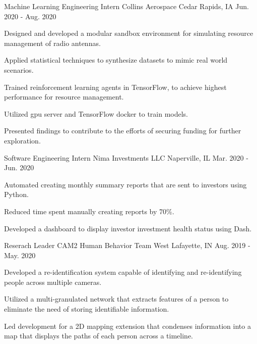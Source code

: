 
\begin{cventries}
  \cventry
    {Machine Learning Engineering Intern}
    {Collins Aerospace}
    {Cedar Rapids, IA}
    {Jun. 2020 - Aug. 2020}
    {
      \begin{cvitems}
          \item {Designed and developed a modular sandbox environment for simulating resource management of radio antennas.}
          \item {Applied statistical techniques to synthesize datasets to mimic real world scenarios.}
          \item{Trained reinforcement learning agents in TensorFlow, to achieve highest performance for resource management.}
          \item{Utilized gpu server and TensorFlow docker to train models.}
          \item{Presented findings to contribute to the efforts of securing funding for further exploration.}
      \end{cvitems}
    }
  \cventry
    {Software Engineering Intern} %
    {Nima Investments LLC} %
    {Naperville, IL} %
    {Mar. 2020 - Jun. 2020} %
    {
      \begin{cvitems} %
        \item{Automated creating monthly summary reports that are sent to investors using Python.}
        \item{Reduced time spent manually creating reports by 70\%}.
        \item{Developed a dashboard to display investor investment health status using Dash.}
      \end{cvitems}
    }
 
  \cventry
    {Reserach Leader} %
    {CAM2 Human Behavior Team} %
    {West Lafayette, IN} %
    {Aug. 2019 - May. 2020} %
    {
      \begin{cvitems} %
        \item{Developed a re-identification system capable of identifying and re-identifying people across multiple cameras.}
        \item{Utilized a multi-granulated network that extracts features of a person to eliminate the need of storing identifiable information.}
        \item{Led development for a 2D mapping extension that condenses information into a map that displays the paths of each person across a timeline.}
      \end{cvitems}
    }
  

\end{cventries}
